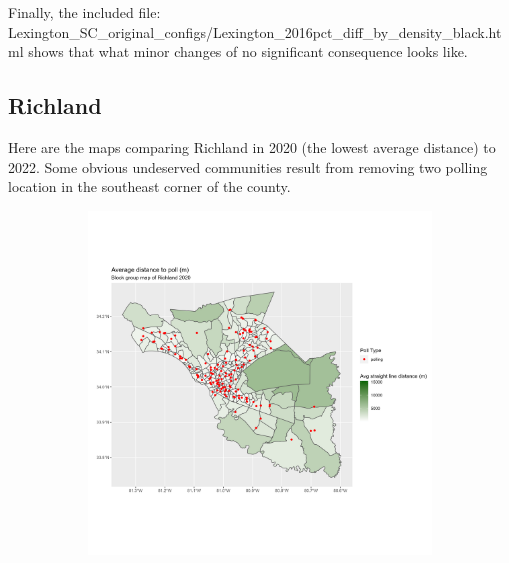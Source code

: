 \documentclass[11pt]{article}
\theoremstyle{remark}
\theoremstyle{definition}
\begin{document}
Finally, the included file: \textrm{Lexington\_SC\_original\_configs/Lexington\_2016pct\_diff\_by\_density\_black.html} shows that what minor changes of no significant consequence looks like. 
\pagebreak

\subsection{Richland}
Here are the maps comparing Richland in 2020 (the lowest average distance) to 2022. Some obvious undeserved communities result from removing two polling location in the southeast corner of the county.


\begin{figure}
	\begin{subfigure}{.5\textwidth}
		\centering
		\includegraphics[width=\linewidth]{result_analysis/Richland_County_SC_original_configs/distance_map_Richland_config_original_2020_polls.png}
		\label{sfig:York_2020_bg_dist}
	\end{subfigure} 
	\begin{subfigure}{.5\textwidth}
		\centering

\end{subfigure}
\end{figure}
\end{document}
